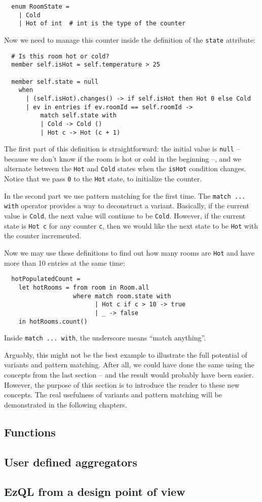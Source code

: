 \documentclass[a4,11pt]{report}
\begin{document}
\begin{lstlisting}
  enum RoomState =
    | Cold
    | Hot of int  # int is the type of the counter
\end{lstlisting}

Now we need to manage this counter inside the definition of the
\verb=state= attribute:

\begin{lstlisting}
  # Is this room hot or cold?
  member self.isHot = self.temperature > 25

  member self.state = null
    when
      | (self.isHot).changes() -> if self.isHot then Hot 0 else Cold
      | ev in entries if ev.roomId == self.roomId ->
          match self.state with
          | Cold -> Cold ()
          | Hot c -> Hot (c + 1)

\end{lstlisting}


The first part of this definition is straightforward: the initial
value is \verb=null= -- because we don't know if the room is hot or
cold in the beginning --, and we alternate between the \verb=Hot= and
\verb=Cold= states when the \verb=isHot= condition changes. Notice
that we pass \verb=0= to the \verb=Hot= state, to initialize the
counter.

In the second part we use pattern matching for the first time. The
\verb=match ... with= operator provides a way to deconstruct a
variant. Basically, if the current value is \verb=Cold=, the next
value will continue to be \verb=Cold=. However, if the current state
is \verb=Hot c= for any counter \verb=c=, then we would like the next
state to be \verb=Hot= with the counter incremented.

Now we may use these definitions to find out how many rooms are
\verb=Hot= and have more than 10 entries at the same time:

\begin{lstlisting}
  hotPopulatedCount =
    let hotRooms = from room in Room.all
                   where match room.state with
                         | Hot c if c > 10 -> true
                         | _ -> false
    in hotRooms.count()
\end{lstlisting}

Inside \verb=match ... with=, the underscore means ``match anything''.

Arguably, this might not be the best example to illustrate the full
potential of variants and pattern matching. After all, we could have
done the same using the concepts from the last section -- and the
result would probably have been easier. However, the purpose of this
section is to introduce the reader to these new concepts. The real
usefulness of variants and pattern matching will be demonstrated in
the following chapters.

\subsection{Functions}

\subsection{User defined aggregators}

\subsection{EzQL from a design point of view}
\end{document}

